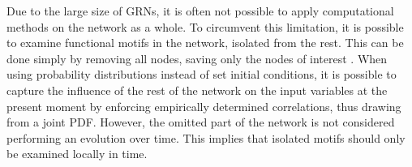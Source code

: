 \documentclass[../main.tex]{subfiles}
\begin{document}
Due to the large size of GRNs, it is often not possible to apply computational methods on the network as a whole.
To circumvent this limitation, it is possible to examine functional motifs in the network, isolated from the rest.
This can be done simply by removing all nodes, saving only the nodes of interest \cite{zhang2012chaotic}.
When using probability distributions instead of set initial conditions, it is possible to capture the influence of the rest of the network on the input variables at the present moment by enforcing empirically determined correlations, thus drawing from a joint PDF.
However, the omitted part of the network is not considered performing an evolution over time.
This implies that isolated motifs should only be examined locally in time. %
\end{document}
